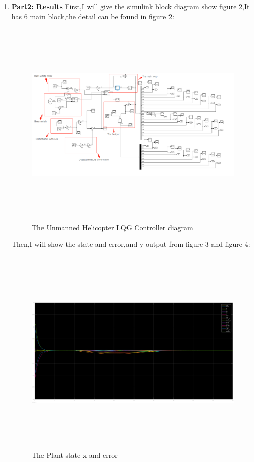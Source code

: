 \documentclass[12pt, a4paper]{article}
\begin{document}
\begin{enumerate}[1.]
\item \textbf{ Part2: Results}
First,I will give the simulink block diagram show figure 2,It has 6 main block,the detail can be found in figure 2:\\
\begin{figure}[H]
    \centering
    \includegraphics[width=20cm,height=10cm,scale=0.6]{block_diagram.png}
    \caption{The Unmanned Helicopter LQG Controller diagram}
    \label{fig:label}
    \end{figure}

Then,I will show the state and error,and y output from figure 3 and figure 4:\\
\begin{figure}[H]
    \centering
    \includegraphics[width=20cm,height=10cm,scale=0.6]{state_18.png}
    \caption{The Plant state x and error}
    \label{fig:label}
    \end{figure}


\end{enumerate}
\end{document}
